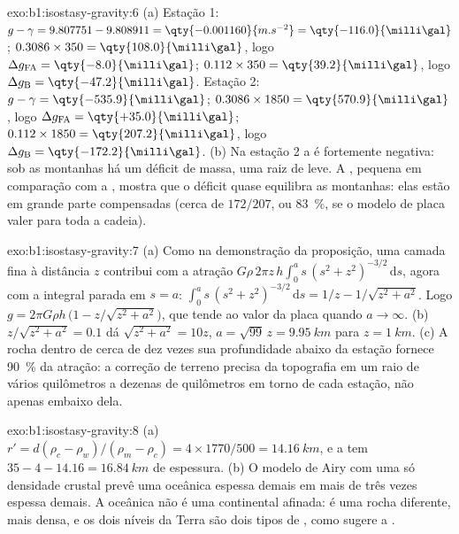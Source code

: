 \begin{solution}{exo:b1:isostasy-gravity:6}
(a) Estação 1: $g - \gamma = 9.807751 - 9.808911 = \qty{-0.001160}{m.s^{-2}} =
\qty{-116.0}{\milli\gal}$;  $0.3086\times350 =
\qty{108.0}{\milli\gal}$, logo $\Delta g_{\mathrm{FA}} = \qty{-8.0}{\milli\gal}$;
 $0.112\times350 = \qty{39.2}{\milli\gal}$, logo
$\Delta g_{\mathrm B} = \qty{-47.2}{\milli\gal}$.
Estação 2: $g - \gamma = \qty{-535.9}{\milli\gal}$; 
$0.3086\times1850 = \qty{570.9}{\milli\gal}$, logo $\Delta g_{\mathrm{FA}} =
\qty{+35.0}{\milli\gal}$;  $0.112\times1850 =
\qty{207.2}{\milli\gal}$, logo $\Delta g_{\mathrm B} = \qty{-172.2}{\milli\gal}$.
(b) Na estação 2 a  é fortemente negativa: sob as montanhas há um
déficit de massa, uma raiz de  leve. A , pequena em comparação com a
, mostra que o déficit quase equilibra as montanhas: elas estão em grande parte compensadas
(cerca de $172/207$, ou \qty{83}{\percent}, se o modelo de placa valer para toda a cadeia).
\end{solution}

\begin{solution}{exo:b1:isostasy-gravity:7}
(a) Como na demonstração da proposição, uma camada fina à distância $z$
contribui com a atração $G\rho\,2\pi z\,h\int_0^a s\,(s^2 + z^2)^{-3/2}\,\mathrm ds$, agora
com a integral parada em $s = a$:
$\int_0^a s\,(s^2 + z^2)^{-3/2}\,\mathrm ds = 1/z - 1/\sqrt{z^2 + a^2}$. Logo
$g = 2\pi G\rho h\,\bigl(1 - z/\sqrt{z^2 + a^2}\bigr)$, que tende ao valor da placa
quando $a \to \infty$. (b) $z/\sqrt{z^2 + a^2} = 0.1$ dá
$\sqrt{z^2 + a^2} = 10z$, $a = \sqrt{99}\,z = \qty{9.95}{km}$ para
$z = \qty{1}{km}$. (c) A rocha dentro de cerca de dez vezes sua profundidade abaixo da
estação fornece \qty{90}{\percent} da atração: a correção de terreno
precisa da topografia em um raio de vários quilômetros a dezenas de quilômetros em torno de cada
estação, não apenas embaixo dela.
\end{solution}

\begin{solution}{exo:b1:isostasy-gravity:8}
(a) $r' = d(\rho_c - \rho_w)/(\rho_m - \rho_c) = 4\times1770/500 =
\qty{14.16}{km}$, e a  tem $35 - 4 - 14.16 = \qty{16.84}{km}$ de espessura.
(b) O modelo de Airy com uma só densidade crustal prevê uma  oceânica espessa demais em mais de
três vezes espessa demais. A  oceânica não é uma  continental afinada: é
uma rocha diferente, mais densa, e os dois níveis da Terra são dois tipos de
, como sugere a .
\end{solution}

